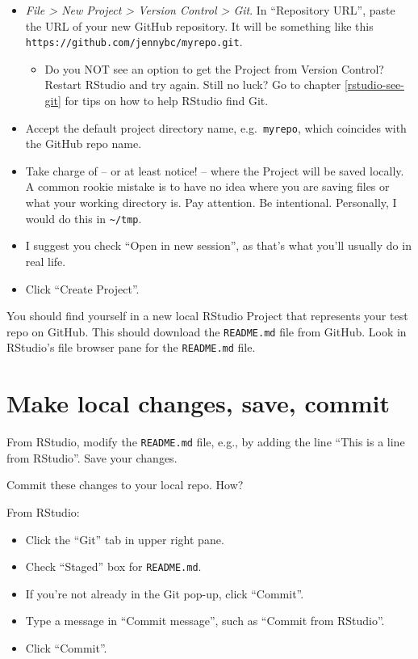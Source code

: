 \documentclass[
]{book}
\providecommand{\tightlist}{%
  \setlength{\itemsep}{0pt}\setlength{\parskip}{0pt}}
\begin{document}
\begin{itemize}
\tightlist
\item
  \emph{File \textgreater{} New Project \textgreater{} Version Control \textgreater{} Git}. In ``Repository URL'', paste the URL of your new GitHub repository. It will be something like this \texttt{https://github.com/jennybc/myrepo.git}.

  \begin{itemize}
  \tightlist
  \item
    Do you NOT see an option to get the Project from Version Control? Restart RStudio and try again. Still no luck? Go to chapter \ref{rstudio-see-git} for tips on how to help RStudio find Git.
  \end{itemize}
\item
  Accept the default project directory name, e.g.~\texttt{myrepo}, which coincides with the GitHub repo name.
\item
  Take charge of -- or at least notice! -- where the Project will be saved locally. A common rookie mistake is to have no idea where you are saving files or what your working directory is. Pay attention. Be intentional. Personally, I would do this in \texttt{\textasciitilde{}/tmp}.
\item
  I suggest you check ``Open in new session'', as that's what you'll usually do in real life.
\item
  Click ``Create Project''.
\end{itemize}

You should find yourself in a new local RStudio Project that represents your test repo on GitHub.
This should download the \texttt{README.md} file from GitHub.
Look in RStudio's file browser pane for the \texttt{README.md} file.

\section{Make local changes, save, commit}\label{make-local-changes-save-commit}

From RStudio, modify the \texttt{README.md} file, e.g., by adding the line ``This is a line from RStudio''. Save your changes.

Commit these changes to your local repo. How?

From RStudio:

\begin{itemize}
\tightlist
\item
  Click the ``Git'' tab in upper right pane.
\item
  Check ``Staged'' box for \texttt{README.md}.
\item
  If you're not already in the Git pop-up, click ``Commit''.
\item
  Type a message in ``Commit message'', such as ``Commit from RStudio''.
\item
  Click ``Commit''.
\end{itemize}
\end{document}
